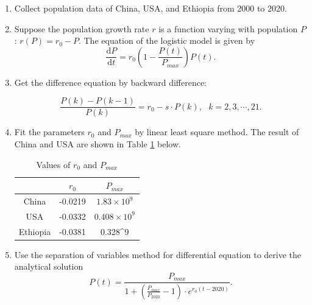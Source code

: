 \documentclass[12pt]{article}
\begin{document}
\begin{enumerate}
    \item Collect population data of China, USA, and Ethiopia from 2000 to 2020.
    \item Suppose the population growth rate $r$ is a function varying with population $P$: $r(P) = r_0 - P$. The equation of the logistic model is given by $$\frac{\mathrm{d} P}{\mathrm{d} t} = r_0 (1-\frac{P(t)}{P_{max}})P(t).$$
    \item Get the difference equation by backward difference:
    
    $$\frac{P(k)-P(k-1)}{P(k)} = r_0 - s\cdot P(k),\text{ }k = 2, 3, \cdots, 21.$$
    
    \item Fit the parameters $r_0$ and $P_{max}$ by linear least square method. The result of China and USA are shown in Table \ref{tab:pplt} below. 
    
    \begin{table}[H]
        \centering
        \caption{\label{tab:pplt} Values of $r_0$ and $P_{max}$}
        \vspace{1em}
        \begin{tabular}{ccc}
            \toprule
            & $r_0$ & $P_{max}$ \\
            \midrule
            China & -0.0219 & $1.83\times 10^9$ \\ 
            USA & -0.0332 & $0.408\times 10^9$ \\
            Ethiopia & -0.0381 & 0.328\times 10^9\\
            \bottomrule
        \end{tabular}
    \end{table}
    
    \item Use the separation of variables method for differential equation to derive the analytical solution 
    $$P(t) = \frac{P_{max}}{1+(\frac{P_{max}}{P_{2020}}-1)\cdot e^{r_0(t-2020)}}.$$
\end{enumerate}
\end{document}

